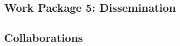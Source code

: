 \documentclass{llncs}
\begin{document}
\subsection{Work Package 5: Dissemination}
\label{sec:wp5} 
 


\subsection{Collaborations}
\label{sec:collaborations}
 




% 
\end{document}
